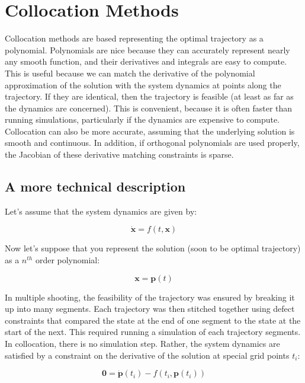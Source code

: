 \section{Collocation Methods}

Collocation methods are based representing the optimal trajectory as a polynomial. Polynomials are nice because they can accurately represent nearly any smooth function, and their derivatives and integrals are easy to compute. This is useful because we can match the derivative of the polynomial approximation of the solution with the system dynamics at points along the trajectory. If they are identical, then the trajectory is feasible (at least as far as the dynamics are concerned). This is convenient, because it is often faster than running simulations, particularly if the dynamics are expensive to compute. Collocation can also be more accurate, assuming that the underlying solution is smooth and continuous. In addition, if orthogonal polynomials are used properly, the Jacobian of these derivative matching constraints is sparse.

\subsection{A more technical description}

 Let's assume that the system dynamics are given by:

\begin{equation} \label{eq:SystemDynamics}
\dot{\mathbf{x}} = f\left( t,\mathbf{x} \right)
\end{equation}

Now let's suppose that you represent the solution (soon to be optimal trajectory) as a $n^{th}$ order polynomial:

\begin{equation} \label{eq:PolynomialFunction}
\mathbf{x} = \mathbf{p}(t)
\end{equation}

In multiple shooting, the feasibility of the trajectory was ensured by breaking it up into many segments. Each trajectory was then stitched together using defect constraints that compared the state at the end of one segment to the state at the start of the next. This required running a simulation of each trajectory segments. In collocation, there is no simulation step. Rather, the system dynamics are satisfied by a constraint on the derivative of the solution at special grid points $t_i$:

\begin{equation} \label{eq:collocationDefects}
\mathbf{0} = \dot{\mathbf{p}}(t_i) - f\left( t_i,\mathbf{p}(t_i)  \right)
\end{equation}

